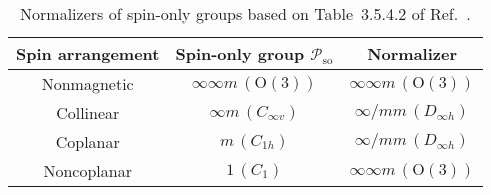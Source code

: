 \begin{table}[tb]
  \centering
  \caption{
    Normalizers of spin-only groups based on Table~3.5.4.2 of Ref.~\cite{koch2016normalizers}.
  }
  \label{tab:spin_only_normalizers}
  \begin{tabular}{ccc}
    \hline \hline
    Spin arrangement & Spin-only group $\mathcal{P}_{\mathrm{so}}$ & Normalizer \\
    \hline
    Nonmagnetic & $\infty \infty m \,(\mathrm{O}(3))$ & $\infty \infty m \,(\mathrm{O}(3))$ \\
    Collinear & $\infty m \,(C_{\infty v})$ & $\infty / mm \, (D_{\infty h})$ \\
    Coplanar & $m \,(C_{1h})$ & $\infty / mm \, (D_{\infty h})$ \\
    Noncoplanar & $1 \, (C_{1})$ & $\infty \infty m \,(\mathrm{O}(3))$ \\
    \hline \hline
  \end{tabular}
\end{table}

